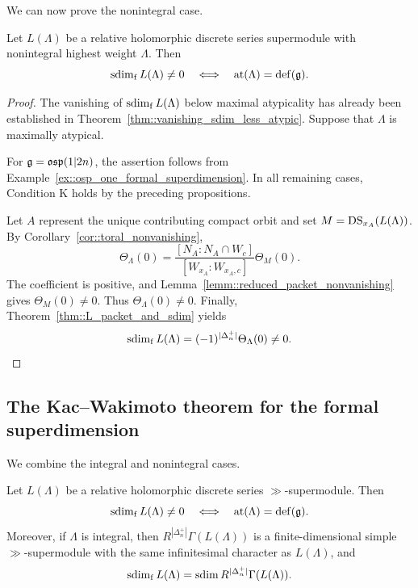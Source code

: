 We can now prove the nonintegral case.

\begin{theorem}
\label{thm::formal_Kac_Wakimoto}
Let $L(\Lambda)$ be a relative holomorphic discrete series
supermodule with nonintegral highest weight $\Lambda$. Then
\begin{equation*}
\operatorname{sdim}_{\mathrm f} L(\Lambda)\neq0
\quad\Longleftrightarrow\quad
{\operatorname{at}}(\Lambda)={\mathrm{def}}({\mathfrak{g}}).
\end{equation*}
\end{theorem}

\begin{proof}
The vanishing of $\operatorname{sdim}_{\mathrm f} L(\Lambda)$ below maximal atypicality
has already been established in Theorem~\ref{thm::vanishing_sdim_less_atypic}. Suppose that $\Lambda$ is maximally atypical.

For ${\mathfrak{g}}={\mathfrak{osp}}(1\vert2n)$, the assertion follows from
Example~\ref{ex::osp_one_formal_superdimension}.
In all remaining cases, Condition K holds by the preceding
propositions.

Let $A$ represent the unique contributing compact orbit
and set $M=\operatorname{DS}_{x_A}(L(\Lambda))$.
By Corollary~\ref{cor::toral_nonvanishing},
\begin{equation*}
\Theta_\Lambda(0)
=
\frac{[N_A:N_A\cap W_c]}
     {[W_{x_A}:W_{x_A,c}]}
\Theta_M(0).
\end{equation*}
The coefficient is positive, and
Lemma~\ref{lemm::reduced_packet_nonvanishing}
gives $\Theta_M(0)\neq0$.
Thus $\Theta_\Lambda(0)\neq0$.
Finally, Theorem~\ref{thm::L_packet_and_sdim} yields
\begin{equation*}
\operatorname{sdim}_{\mathrm f} L(\Lambda)
=
(-1)^{|\Delta_n^+|}\Theta_\Lambda(0)
\neq0.\qedhere
\end{equation*}
\end{proof}


\subsection{The Kac--Wakimoto theorem for the formal superdimension}
\label{subsec::KW_main}

We combine the integral and nonintegral cases.

\begin{theorem}\label{thm::KW_formal_superdimension}
Let $L(\Lambda)$ be a relative holomorphic discrete series $\gg$-supermodule. Then
\begin{equation*}
\operatorname{sdim}_{\mathrm f} L(\Lambda)\neq0
\quad\Longleftrightarrow\quad
{\operatorname{at}}(\Lambda)={\mathrm{def}}({\mathfrak{g}}).
\end{equation*}
Moreover, if $\Lambda$ is integral, then $R^{|\Delta_n^+|}\Gamma(L(\Lambda))$ is a finite-dimensional simple $\gg$-supermodule with the same infinitesimal character as $L(\Lambda)$, and
\begin{equation*}
\operatorname{sdim}_{\mathrm f} L(\Lambda)=\operatorname{sdim} R^{|\Delta_n^+|}\Gamma(L(\Lambda)).
\end{equation*}
\end{theorem}

